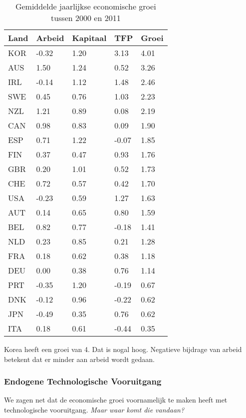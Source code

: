 \begin{table}[H]
\centering
\begin{tabular}{lllll}
\textbf{Land} & \textbf{Arbeid}  & \textbf{Kapitaal}  & \textbf{TFP}  & \textbf{Groei}  \\
\hline
KOR & -0.32 & 1.20 & 3.13 & 4.01 \\
AUS & 1.50 & 1.24 & 0.52 & 3.26 \\
IRL & -0.14 & 1.12 & 1.48 & 2.46 \\
SWE & 0.45 & 0.76 & 1.03 & 2.23 \\
NZL & 1.21 & 0.89 & 0.08 & 2.19 \\
CAN & 0.98 & 0.83 & 0.09 & 1.90 \\
ESP & 0.71 & 1.22 & -0.07 & 1.85 \\
FIN & 0.37 & 0.47 & 0.93 & 1.76 \\
GBR & 0.20 & 1.01 & 0.52 & 1.73 \\
CHE & 0.72 & 0.57 & 0.42 & 1.70 \\
USA & -0.23 & 0.59 & 1.27 & 1.63 \\
AUT & 0.14 & 0.65 & 0.80 & 1.59 \\
BEL & 0.82 & 0.77 & -0.18 & 1.41 \\
NLD & 0.23 & 0.85 & 0.21 & 1.28 \\
FRA & 0.18 & 0.62 & 0.38 & 1.18 \\
DEU & 0.00 & 0.38 & 0.76 & 1.14 \\
PRT & -0.35 & 1.20 & -0.19 & 0.67 \\
DNK & -0.12 & 0.96 & -0.22 & 0.62 \\
JPN & -0.49 & 0.35 & 0.76 & 0.62 \\
ITA & 0.18 & 0.61 & -0.44 & 0.35
\end{tabular}
\caption{Gemiddelde jaarlijkse economische groei tussen 2000 en 2011}
\label{tab:h6gemgroei}
\end{table}

Korea heeft een groei van 4. Dat is nogal hoog. Negatieve bijdrage van arbeid betekent dat er minder aan arbeid wordt gedaan.

\subsubsection{Endogene Technologische Vooruitgang}

We zagen net dat de economische groei voornamelijk te maken heeft met technologische vooruitgang. \textit{Maar waar komt die vandaan?}\\

